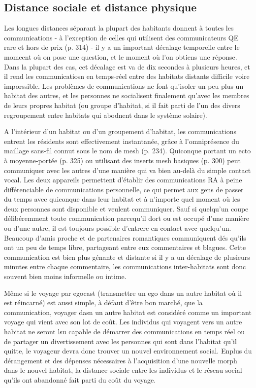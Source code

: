    \subsection{Distance sociale et distance physique} \label{sec:real-social-distance} 

   Les longues distances séparant la plupart des habitants donnent à toutes les communications - à l'exception de celles qui utilisent des communicateurs QE rare et hors de prix (p. 314) - il y a un important décalage temporelle entre le momeent où on pose une question, et le moment où l'on obtiens une réponse. Dans la plupart des cas, cet décalage est va de dix secondes à plusieurs heures, et il rend les communicatiosn en temps-réel entre des habitats distants difficile voire imporssible. Les problèmes de communications ne font qu'isoler un peu plus un habitat des autres, et les personnes ne socialisent finalement qu'avec les membres de leurs propres habitat (ou groupe d'habitat, si il fait parti de l'un des divers regroupement entre habitats qui abodnent dans le système solaire). 

   A l'intérieur d'un habitat ou d'un groupement d'habitat, les communications entrent les résidents sont effectivement instantanée, grâce à l'omniprésence du maillage sans-fil connut sous le nom de mesh (p. 234). Quiconque portant un ecto à moyenne-portée (p. 325) ou utilisant des inserts mesh basiques (p. 300) peut communiquer avec les autres d'une manière qui va bien au-delà du simple contact vocal. Les deux appareils permettent d'établir des communications RA à peine différenciable de communications personnelle, ce qui permet aux gens de passer du temps avec quiconque dans leur habitat et à n'importe quel moment où les deux personnes sont disponible et veulent communiquer. Sauf si quelqu'un coupe délibéremment toute communication parcequ'il dort ou est occupé d'une manière ou d'une autre, il est toujours possible d'entrere en contact avec quelqu'un. Beaucoup d'amis proche et de partenaires romantiques communiquent dés qu'ils ont un peu de temps libre, partageant entre eux commentaires et blagues. Cette communication est bien plus génante et distante si il y a un décalage de plusieurs minutes entre chaque commentaire, les communications inter-habitats sont donc souvent bien moins informelle ou intime. 

   Même si le voyage par egocast (transmettre un ego dans un autre habitat où il est réincarné) est aussi simple, à défaut d'être bon marché, que la communication, voyager dasn un autre habitat est considéré comme un important voyage qui vient avec son lot de coût. Les individus qui voyagent vers un autre habitat ne seront lsu capable de démarrer des communications en temps réel ou de partager un divertissement avec les personnes qui sont dans l'habitat qu'il quitte, le voyageur devra donc trouver un nouvel environnement social. Enplus du dérangement et des dépenses nécessaires à l'acquisition d'une nouvelle morph dans le nouvel habitat, la distance sociale entre les individus et le réseau social qu'ils ont abandonné fait parti du coût du voyage. 

